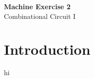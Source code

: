 \clearpage
\setcounter{page}{1}

\begin{center}
    \vspace*{3em}
    {\LARGE \textbf{Machine Exercise 2}}\\
    {\vspace{1.5em}}
    {\large Combinational Circuit I}\\
\end{center}

\section{Introduction}
    hi